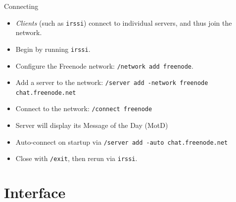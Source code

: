 \documentclass{beamer}
\begin{document}
\begin{frame}{Connecting}
\begin{itemize}
	\item \emph{Clients} (such as \texttt{irssi}) connect to individual servers, and thus join the network.
	\item Begin by running \texttt{irssi}.
	\item Configure the Freenode network: \texttt{/network add freenode}.
	\item Add a server to the network:  \texttt{/server add -network freenode chat.freenode.net}
	\item Connect to the network: \texttt{/connect freenode}
	\item Server will display its Message of the Day (MotD)
	\item Auto-connect on startup via \texttt{/server add -auto chat.freenode.net}
	\item Close with \texttt{/exit}, then rerun via \texttt{irssi}.
\end{itemize}
\end{frame}

\section{Interface}
\end{document}
